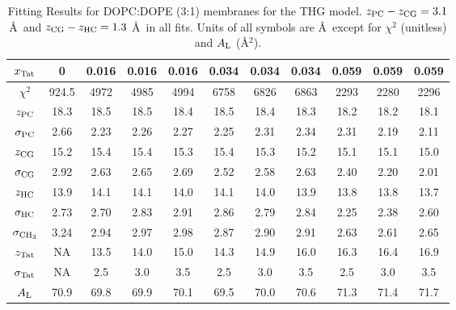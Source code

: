 \begin{table}[htbp]
  \centering
  \begin{tabular}{c|c|ccc|ccc|ccc}
    \hline
    $x_\textrm{Tat}$ & 0 & 0.016 & 0.016 & 0.016 & 0.034 & 0.034 & 0.034 & 0.059 & 0.059 & 0.059 \\
    \hline
    $\chi^2$ & 924.5 & 4972 & 4985 & 4994 & 6758 & 6826 & 6863 & 2293 & 2280 & 2296 \\ 
    $z_\textrm{PC}$ & 18.3 & 18.5 & 18.5 & 18.4 & 18.5 & 18.4 & 18.3 & 18.2 & 18.2 & 18.1 \\
    $\sigma_\textrm{PC}$ & 2.66 & 2.23 & 2.26 & 2.27 & 2.25 & 2.31 & 2.34 & 2.31 & 2.19 & 2.11 \\
    $z_\textrm{CG}$ & 15.2 & 15.4 & 15.4 & 15.3 & 15.4 & 15.3 & 15.2 & 15.1 & 15.1 & 15.0 \\
    $\sigma_\textrm{CG}$ & 2.92 & 2.63 & 2.65 & 2.69 & 2.52 & 2.58 & 2.63 & 2.40 & 2.20 & 2.01 \\
    $z_\textrm{HC}$ & 13.9 & 14.1 & 14.1 & 14.0 & 14.1 & 14.0 & 13.9 & 13.8 & 13.8 & 13.7 \\
    $\sigma_\textrm{HC}$ & 2.73 & 2.70 & 2.83 & 2.91 & 2.86 & 2.79 & 2.84 & 2.25 & 2.38 & 2.60 \\
    $\sigma_{\textrm{CH}_3}$ & 3.24 & 2.94 & 2.97 & 2.98 & 2.87 & 2.90 & 2.91 & 2.63 & 2.61 & 2.65 \\
    $z_\textrm{Tat}$ & NA & 13.5 & 14.0 & 15.0 & 14.3 & 14.9 & 16.0 & 16.3 & 16.4 & 16.9 \\
    $\sigma_\textrm{Tat}$ & NA & 2.5 & 3.0 & 3.5 & 2.5 & 3.0 & 3.5 & 2.5 & 3.0 & 3.5 \\ 
    $A_\textrm{L}$ & 70.9 & 69.8 & 69.9 & 70.1 & 69.5 & 70.0 & 70.6 & 71.3 & 71.4 & 71.7 \\
    \hline
  \end{tabular}
  \caption{Fitting Results for DOPC:DOPE (3:1) membranes for the THG model. $z_\textrm{PC}-z_\textrm{CG} = 3.1$ \AA\
  and $z_\textrm{CG}-z_\textrm{HC} = 1.3$ \AA\ in all fits.
  Units of all symbols are \AA\ except for $\chi^2$ (unitless) and $A_\textrm{L}$ (\AA$^2$).}
  \label{tab:DOPCDOPE3to1_fit_results}
\end{table}

